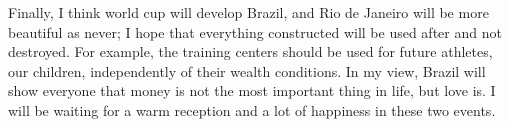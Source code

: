 \documentclass[a4paper,12pt]{article}
\begin{document}
Finally, I think world cup will develop  Brazil, and Rio de Janeiro will be more
beautiful as  never; I hope that  everything constructed will be  used after and
not destroyed. For example, the training centers should be used for future athletes,
our children, independently of their  wealth conditions. In my view, Brazil will
show everyone that money is not the most important thing in life, but love is. I will
be waiting for a warm reception and a lot of happiness in these two events.







\end{document}
